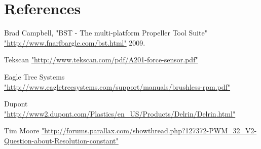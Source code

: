 \documentclass{article}
\numberwithin{equation}{section} %
\begin{document}

\section{References}

\begin{thebibliography}{99}


	Brad Campbell, 
	"BST - The multi-platform Propeller Tool Suite" 
	\url{"http://www.fnarfbargle.com/bst.html"} 2009.


	Tekscan\textregistered 
	\url{"http://www.tekscan.com/pdf/A201-force-sensor.pdf"}
	
	Eagle Tree Systems \textregistered
	\url{"http://www.eagletreesystems.com/support/manuals/brushless-rpm.pdf"}

	Dupont\texttrademark
	\url{"http://www2.dupont.com/Plastics/en_US/Products/Delrin/Delrin.html"}
	
	Tim Moore
	\url{"http://forums.parallax.com/showthread.php?127372-PWM_32_V2-Question-about-Resolution-constant"}
	
	
	
	
\end{thebibliography}


\end{document}
